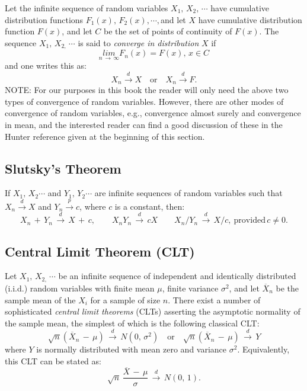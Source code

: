 \documentclass[graybox,envcountchap,sectrefs]{svmono}\usepackage[]{graphicx}\usepackage[]{xcolor}
\begin{document}
\begin{appendices}
Let the infinite sequence of random variables $X_{1},\,X_{2},\,\cdots$
have cumulative distribution functions $F_{1}(x),\,F_{2}(x),\cdots,$and
let $X$ have cumulative distribution function $F(x)$, and let $C$
be the set of points of continuity of $F(x)$. The sequence $X_{1},\,X_{2,}\,\cdots$
is said to \emph{converge in distribution} $X$ if
\begin{equation}
\underset{n\,\rightarrow\,\infty}{lim}F_{n}(x)=F(x),\,x\in C\label{eq: convInDist}
\end{equation}
and one writes this as:
\begin{equation}
X_{n}\overset{d}{\rightarrow}X\quad\mathrm{or}\quad X_{n}\overset{d}{\rightarrow}F.
\end{equation}
NOTE: For our purposes in this book the reader will only need the
above two types of convergence of random variables. However, there
are other modes of convergence of random variables, e.g., convergence
almost surely and convergence in mean, and the interested reader can
find a good discussion of these in the Hunter reference given at the
beginning of this section.

\subsection{Slutsky's Theorem}

If $X_{1},\,X_{2}\cdots$ and $Y_{1},\,Y_{2}\cdots$ are infinite
sequences of random variables such that $X_{n}\overset{d}{\rightarrow}X$
and $Y_{n}\overset{p}{\rightarrow}c$, where $c$ is a constant, then:
\[
X_{n}\,+\,Y_{n}\,\overset{d}{\rightarrow}\,X\,+\,c,\qquad X_{n}Y_{n}\,\overset{d}{\rightarrow}\,cX\qquad X_{n}/Y_{n}\,\overset{d}{\rightarrow}\,X/c,\:\mathrm{provided}\,c\ne0.
\]


\subsection{Central Limit Theorem (CLT)}

Let $X_{1},\,X_{2,}\,\cdots$ be an infinite sequence of independent
and identically distributed (i.i.d.) random variables with finite
mean $\mu$, finite variance $\sigma^{2}$, and let $\overline{X}_{n}$
be the sample mean of the $X_{i}$ for a sample of size $n$. There
exist a number of sophisticated \emph{central limit theorems} (CLTs)
asserting the asymptotic normality of the sample mean, the simplest
of which is the following classical CLT:
\begin{equation}
\sqrt{n}\left(\overline{X}_{n}\,-\,\mu\right)\,\overset{d}{\rightarrow}\,N\left(0,\,\sigma^{2}\right)\quad\mathrm{or}\quad\sqrt{n}\left(\overline{X}_{n}\,-\,\mu\right)\,\overset{d}{\rightarrow}\,Y\label{eq: CLTv1}
\end{equation}
where $Y$ is normally distributed with mean zero and variance $\sigma^{2}$.
Equivalently, this CLT can be stated as:
\begin{equation}
\sqrt{n}\,\dfrac{\overline{X}\,-\,\mu}{\sigma}\,\overset{d}{\rightarrow}\,N\left(0,\,1\right).\label{eq: CLTv2}
\end{equation}



\end{appendices}
\end{document}
